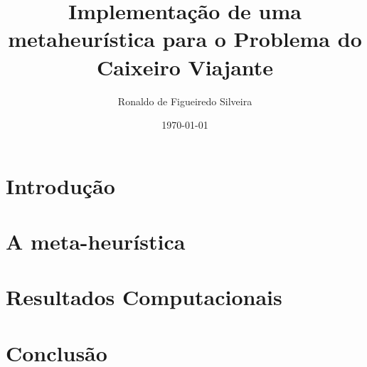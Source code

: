 \documentclass[a4paper]{article}
\title{Implementação de uma metaheurística para o Problema do Caixeiro Viajante}
\author{Ronaldo de Figueiredo Silveira }
\date{\today}
\begin{document}
	\maketitle
    
    
    
    
    \section{Introdução}
    	
    	
    \section{A meta-heurística}
	    
	    
	\section{Resultados Computacionais}
		

	\section{Conclusão}
		     
		\newpage   
    
    
\end{document}
